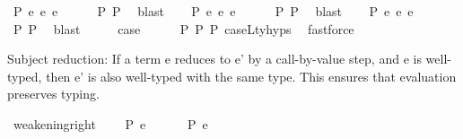 \begin{isabellebody}
\ P{}{\isacharcolon}{\kern0pt}\ {\isachardoublequoteopen}e{}{\isacharprime}{\kern0pt}{\isacharprime}{\kern0pt}\ {\isasymsimeq}e\ e{}{\isacharprime}{\kern0pt}{\isacharprime}{\kern0pt}{\isacharprime}{\kern0pt}{\isachardoublequoteclose}\isanewline
\ \ \ \ \isamarkupfalse%
\ P{}\ P{}\ \isamarkupfalse%
\ blast\isanewline
\ \ \isamarkupfalse%
\ P{}{\isacharcolon}{\kern0pt}\ {\isachardoublequoteopen}e{}{\isacharprime}{\kern0pt}{\isacharprime}{\kern0pt}\ {\isasymsimeq}e\ e{}{\isacharprime}{\kern0pt}{\isacharprime}{\kern0pt}{\isacharprime}{\kern0pt}{\isachardoublequoteclose}\isanewline
\ \ \ \ \isamarkupfalse%
\ P{}\ P{}\ \isamarkupfalse%
\ blast\isanewline
\ \ \isamarkupfalse%
\ P{}{\isacharcolon}{\kern0pt}\ {\isachardoublequoteopen}e{}{\isacharprime}{\kern0pt}{\isacharprime}{\kern0pt}\ {\isasymsimeq}e\ e{}{\isacharprime}{\kern0pt}{\isacharprime}{\kern0pt}{\isacharprime}{\kern0pt}{\isachardoublequoteclose}\isanewline
\ \ \ \ \isamarkupfalse%
\ P{}\ P{}\ \isamarkupfalse%
\ blast\isanewline
\isanewline
\ \ \isamarkupfalse%
\ \isamarkupfalse%
\ {\isacharquery}{\kern0pt}case\isanewline
\ \ \ \ \isamarkupfalse%
\ P{}\ P{}\ P{}\ caseL{\isacharunderscore}{\kern0pt}ty{\isachardot}{\kern0pt}hyps{\isacharparenleft}{\kern0pt}{}{\isacharparenright}{\kern0pt}\ \isamarkupfalse%
\ fastforce\isanewline
{}\isamarkupfalse%
%
\endisatagproof
{\isafoldproof}%
%
\isadelimproof
%
\endisadelimproof
%
\begin{isamarkuptext}%
Subject reduction:
  If a term e reduces to e' by a call-by-value step,
  and e is well-typed,
  then e' is also well-typed with the same type.
  This ensures that evaluation preserves typing.%
\end{isamarkuptext}\isamarkuptrue%
\isamarkupfalse%
\ weakening{\isacharunderscore}{\kern0pt}right{\isacharcolon}{\kern0pt}\isanewline
\ \ \ {\isachardoublequoteopen}{\isasymGamma}\ {\isasymturnstile}{\isacharbraceleft}{\kern0pt}P{\isacharbraceright}{\kern0pt}\ e\ {\isacharcolon}{\kern0pt}\ {\isasymtau}{\isachardoublequoteclose}\isanewline
\ \ \ {\isachardoublequoteopen}{\isasymGamma}{\isacharat}{\kern0pt}{\isasymGamma}{}\ {\isasymturnstile}{\isacharbraceleft}{\kern0pt}P{\isacharbraceright}{\kern0pt}\ e\ {\isacharcolon}{\kern0pt}\ {\isasymtau}{\isachardoublequoteclose}\isanewline

\end{isabellebody}
